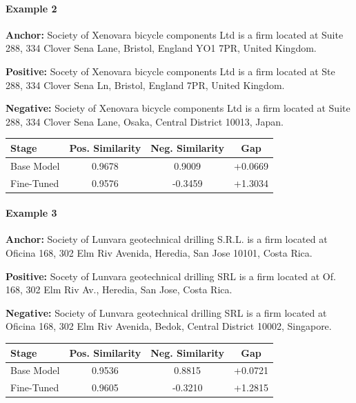 \documentclass{article}
\begin{document}
\paragraph{Example 2}

\textbf{Anchor:} Society of Xenovara bicycle components Ltd is a firm located at Suite 288, 334 Clover Sena Lane, Bristol, England YO1 7PR, United Kingdom.

\textbf{Positive:} Socety of Xenovara bicycle components Ltd is a firm located at Ste 288, 334 Clover Sena Ln, Bristol, England 7PR, United Kingdom.

\textbf{Negative:} Society of Xenovara bicycle components Ltd is a firm located at Suite 288, 334 Clover Sena Lane, Osaka, Central District 10013, Japan.

\begin{center}
\small
\begin{tabular}{lccc}
\toprule
Stage & Pos. Similarity & Neg. Similarity & Gap \\
\midrule
Base Model & 0.9678 & 0.9009 & +0.0669 \\
Fine-Tuned & 0.9576 & -0.3459 & +1.3034 \\
\bottomrule
\end{tabular}
\end{center}

\paragraph{Example 3}

\textbf{Anchor:} Society of Lunvara geotechnical drilling S.R.L. is a firm located at Oficina 168, 302 Elm Riv Avenida, Heredia, San Jose 10101, Costa Rica.

\textbf{Positive:} Socety of Lunvara geotechnical drilling SRL is a firm located at Of. 168, 302 Elm Riv Av., Heredia, San Jose, Costa Rica.

\textbf{Negative:} Society of Lunvara geotechnical drilling SRL is a firm located at Oficina 168, 302 Elm Riv Avenida, Bedok, Central District 10002, Singapore.

\begin{center}
\small
\begin{tabular}{lccc}
\toprule
Stage & Pos. Similarity & Neg. Similarity & Gap \\
\midrule
Base Model & 0.9536 & 0.8815 & +0.0721 \\
Fine-Tuned & 0.9605 & -0.3210 & +1.2815 \\
\bottomrule
\end{tabular}
\end{center}
\end{document}
